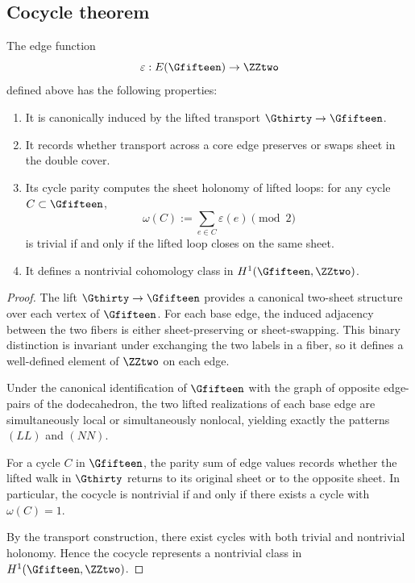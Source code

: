 \subsection{Cocycle theorem}

\begin{theorem}
The edge function
\[
\varepsilon : E(\Gfifteen) \to \ZZtwo
\]
defined above has the following properties:

\begin{enumerate}[label=(\roman*)]
\item It is canonically induced by the lifted transport
$\Gthirty\to \Gfifteen$.

\item It records whether transport across a core edge preserves or swaps
sheet in the double cover.

\item Its cycle parity computes the sheet holonomy of lifted loops:
for any cycle $C\subset \Gfifteen$,
\[
\omega(C):=\sum_{e\in C}\varepsilon(e)\pmod 2
\]
is trivial if and only if the lifted loop closes on the same sheet.

\item It defines a nontrivial cohomology class in
$H^1(\Gfifteen,\ZZtwo)$.
\end{enumerate}
\end{theorem}

\begin{proof}
The lift $\Gthirty\to \Gfifteen$ provides a canonical two-sheet structure
over each vertex of $\Gfifteen$. For each base edge, the induced adjacency
between the two fibers is either sheet-preserving or sheet-swapping. This
binary distinction is invariant under exchanging the two labels in a fiber,
so it defines a well-defined element of $\ZZtwo$ on each edge.

Under the canonical identification of $\Gfifteen$ with the graph of
opposite edge-pairs of the dodecahedron, the two lifted realizations of
each base edge are simultaneously local or simultaneously nonlocal,
yielding exactly the patterns $(LL)$ and $(NN)$.

For a cycle $C$ in $\Gfifteen$, the parity sum of edge values records
whether the lifted walk in $\Gthirty$ returns to its original sheet or
to the opposite sheet. In particular, the cocycle is nontrivial if and
only if there exists a cycle with $\omega(C)=1$.

By the transport construction, there exist cycles with both trivial and
nontrivial holonomy. Hence the cocycle represents a nontrivial class in
$H^1(\Gfifteen,\ZZtwo)$.
\end{proof}

